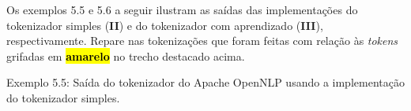 \documentclass[11pt]{report}
\begin{document}
Os exemplos 5.5 e 5.6 a seguir ilustram as saídas das implementações do tokenizador simples (\textbf{II}) e do tokenizador com aprendizado (\textbf{III}), respectivamente. Repare nas tokenizações que foram feitas com relação às \textit{tokens} grifadas em \hl{\textbf{amarelo}} no trecho destacado acima.

\begin{quote}
                 \fbox{-} 
 \fbox{-}   \fbox{-}       \fbox{/}  \fbox{/}   
             \fbox{,} 
              
     \fbox{,}         
          \fbox{,}    
            
\end{quote}
\begin{center}
  Exemplo 5.5: Saída do tokenizador do Apache OpenNLP usando a implementação do tokenizador simples.
\end{center}
\end{document}
